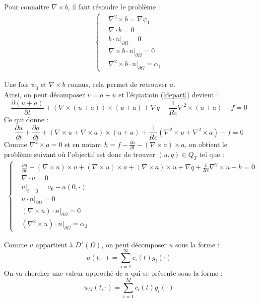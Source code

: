 Pour connaitre $\nabla\times b$, il faut résoudre le problème :
\begin{eqnarray}
\label{curlb}
\left\{
\begin{aligned}
&\nabla^2\times b = \nabla\psi_1\\
&\nabla\cdot b = 0\\
&b\cdot n\big\rvert_{\partial\Omega} = 0\\
&\nabla\times b\cdot n\big\rvert_{\partial\Omega} = 0\\
&\nabla^2\times b\cdot n\big\rvert_{\partial\Omega} = \alpha_1
\end{aligned}
\right.
\end{eqnarray}

Une fois $\psi_0$ et $\nabla\times b$ connus, cela permet de retrouver $a$.\\

Ainsi, on peut décomposer $v=a+u$ et l'équatioin (\ref{depart}) devient :
\[
\frac{\partial(u+a)}{\partial t}+(\nabla\times(u+a))\times(u+a) + \nabla q + \frac{1}{Re}\nabla^2\times(u+a) - f = 0
\]
Ce qui donne :
\[
\frac{\partial u}{\partial t}+\frac{\partial a}{\partial t} + (\nabla\times u+\nabla\times a)\times(u+a) +\frac{1}{Re}(\nabla^2\times u+\nabla^2\times a) - f = 0
\]
Comme $\nabla^2\times a = 0$ et en notant $h=f-\frac{\partial a}{\partial t} - (\nabla\times a)\times a$, on obtient le problème suivant où l'objectif est donc de trouver $(u,q)\in Q_T$ tel que :
\begin{eqnarray}
\label{uci}
\left\{
\begin{aligned}
&\frac{\partial u}{\partial t} + (\nabla\times u)\times u + (\nabla\times u)\times a +(\nabla\times a)\times u + \nabla q  +\frac{1}{Re}\nabla^2\times  u - h = 0\\
&\nabla\cdot u = 0\\
&u\big\rvert_{t=0} = v_0 - a(0,\cdot)\\
&u\cdot n\big\rvert_{\partial\Omega} = 0\\
&(\nabla\times u)\cdot n\big\rvert_{\partial\Omega} = 0\\
&(\nabla^2\times  u)\cdot n\big\rvert_{\partial\Omega} = \alpha_2
\end{aligned}
\right.
\end{eqnarray}

Comme $u$ appartient à $D^1(\Omega)$, on peut décomposer $u$ sous la forme :
\[
u(t,\cdot) = \sum_{i=1}^{\infty} c_i(t)g_i(\cdot)
\]
On va chercher une valeur approché de $u$ qui se présente sous la forme :
\[
u_M(t,\cdot) = \sum_{i=1}^{M} c_i(t)g_i(\cdot)
\]

